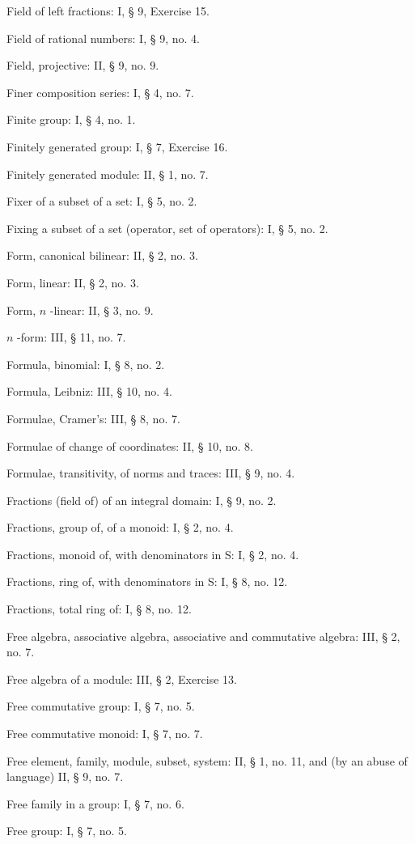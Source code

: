 Field of left fractions: I, § 9, Exercise 15.

Field of rational numbers: I, § 9, no. 4.

Field, projective: II, § 9, no. 9.

Finer composition series: I, § 4, no. 7.

Finite group: I, § 4, no. 1.

Finitely generated group: I, § 7, Exercise 16.

Finitely generated module: II, § 1, no. 7.

Fixer of a subset of a set: I, § 5, no. 2.

Fixing a subset of a set (operator, set of operators): I, § 5, no. 2.

Form, canonical bilinear: II, § 2, no. 3.

Form, linear: II, § 2, no. 3.

Form, \(n\) -linear: II, § 3, no. 9.

\(n\) -form: III, § 11, no. 7.

Formula, binomial: I, § 8, no. 2.

Formula, Leibniz: III, § 10, no. 4.

Formulae, Cramer's: III, § 8, no. 7.

Formulae of change of coordinates: II, § 10, no. 8.

Formulae, transitivity, of norms and traces: III, § 9, no. 4.

Fractions (field of) of an integral domain: I, § 9, no. 2.

Fractions, group of, of a monoid: I, § 2, no. 4.

Fractions, monoid of, with denominators in S: I, § 2, no. 4.

Fractions, ring of, with denominators in S: I, § 8, no. 12.

Fractions, total ring of: I, § 8, no. 12.

Free algebra, associative algebra, associative and commutative algebra: III, § 2, no. 7.

Free algebra of a module: III, § 2, Exercise 13.

Free commutative group: I, § 7, no. 5.

Free commutative monoid: I, § 7, no. 7.

Free element, family, module, subset, system: II, § 1, no. 11, and (by an abuse of language) II, § 9, no. 7.

Free family in a group: I, § 7, no. 6.

Free group: I, § 7, no. 5.

